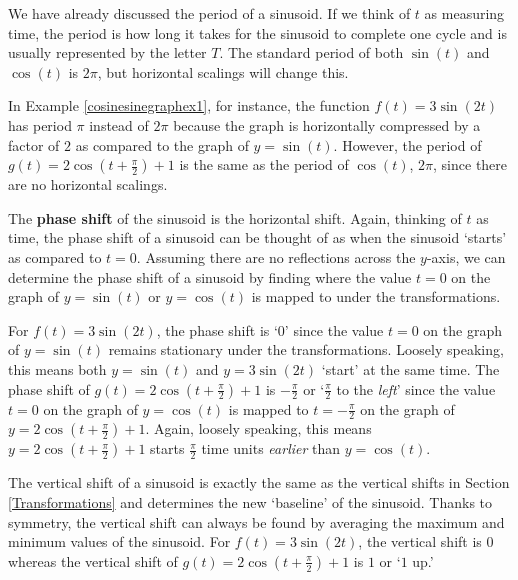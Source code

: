 \documentclass{ximera}
\begin{document}
 
 \smallskip

We have already discussed the period of a sinusoid.  If we think of $t$ as measuring time, the period is how long it takes for the sinusoid to complete one cycle and is usually represented by the letter $T$.   The standard period of both  $\sin(t)$ and $\cos(t)$  is $2\pi$, but horizontal scalings will change  this.

\smallskip

  In Example \ref{cosinesinegraphex1}, for instance,  the function  $f(t) = 3 \sin(2t)$ has period  $\pi$ instead of $2\pi$ because the graph is horizontally compressed by a factor of $2$ as compared to the graph of $y = \sin(t)$.    However, the period of  $g(t) = 2 \cos\left(t +\frac{\pi}{2} \right) +1$ is the same as the period of $\cos(t)$, $2\pi$, since there are no horizontal scalings.
  
  \smallskip
  


The \textbf{phase shift} of the sinusoid is the horizontal shift. Again, thinking of $t$ as time, the phase shift of a sinusoid can be thought of as when the sinusoid `starts' as compared to $t=0$.   Assuming there are no reflections across the $y$-axis, we can determine the phase shift of a sinusoid by finding where the value $t=0$ on the graph of $y = \sin(t)$ or $y=\cos(t)$ is mapped to under the transformations.  


\smallskip

For $f(t) = 3 \sin(2t)$, the phase shift is `$0$' since the value $t=0$ on the graph of $y = \sin(t)$ remains stationary under the transformations. Loosely speaking, this means both $y=\sin(t)$ and $y=3\sin(2t)$ `start' at the same time.  The phase shift of  $g(t) = 2 \cos\left(t +\frac{\pi}{2} \right) +1$ is $-\frac{\pi}{2}$ or `$\frac{\pi}{2}$ to the \textit{left}' since the value $t = 0$ on the graph of $y=\cos(t)$ is mapped to $t = -\frac{\pi}{2}$ on the graph of $y= 2 \cos\left(t +\frac{\pi}{2} \right) +1$.  Again, loosely speaking, this means $y=2 \cos\left(t +\frac{\pi}{2} \right) +1$ starts $\frac{\pi}{2}$ time units \textit{earlier} than $y=\cos(t)$.

  \smallskip
  


 The vertical shift of a sinusoid is exactly the same as the vertical shifts in Section \ref{Transformations} and determines the new `baseline' of the sinusoid.  Thanks to symmetry, the vertical shift can always be found by averaging the maximum and minimum values of the sinusoid.  For $f(t) = 3 \sin(2t)$, the vertical shift is $0$ whereas the vertical shift of $g(t) = 2 \cos\left(t +\frac{\pi}{2} \right) +1$ is $1$ or `$1$ up.'
\end{document}
